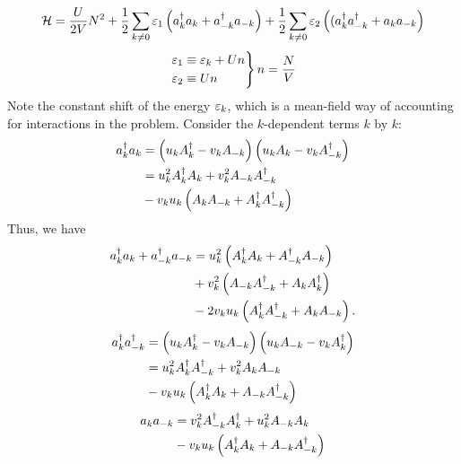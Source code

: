 \begin{equation}
	\label{eq:bose_hubbard_hamiltonian_mft}
	\mathcal{H} = \frac{U}{2V}N^2 + \frac{1}{2}\sum_{k\ne0}\varepsilon_1\left (a_{k}^{\dagger}a_{k} + a_{-k}^{\dagger}a_{-k}\right ) + \frac{1}{2}\sum_{k\ne0}\varepsilon_{2}\left ((a_{k}^{\dagger}a_{-k}^{\dagger} + a_{k}a_{-k}\right )
\end{equation}
\begin{equation}
	\begin{rcases}
		\varepsilon_1 \equiv \varepsilon_k + Un \\
		\varepsilon_2 \equiv Un
	\end{rcases}
	n = \frac{N}{V}
\end{equation}
Note the constant shift of the energy $\varepsilon_k$, which is a mean-field way of accounting for interactions in the problem. 
Consider the $k$-dependent terms $k$ by $k$:
\begin{equation}
	\begin{aligned}
		a_{k}^{\dagger}a_{k} &= \left (u_kA_k^{\dagger}-v_kA_{-k}\right )\left (u_kA_k-v_kA_{-k}^{\dagger}\right ) \\
		&= u_k^2A_{k}^{\dagger}A_{k} + v_{k}^2 A_{-k}A_{-k}^{\dagger} \\
		& - v_ku_k\left (A_{k}A_{-k} + A_{k}^{\dagger}A_{-k}^{\dagger}\right )
	\end{aligned}
\end{equation}
Thus, we have
\begin{equation}
	\begin{aligned}
		a_{k}^{\dagger}a_{k} + a_{-k}^{\dagger}a_{-k} &= u_k^2\left (A_{k}^{\dagger}A_{k} +A_{-k}^{\dagger}A_{-k}\right ) \\
		& + v_{k}^2\left (A_{-k}A_{-k}^{\dagger} + A_{k}A_{k}^{\dagger}\right ) \\
		&-2v_ku_k\left (A_{k}^{\dagger}A_{-k}^{\dagger}+A_{k}A_{-k}\right ).
	\end{aligned}
\end{equation}
\begin{equation}
	\begin{aligned}
		a_{k}^{\dagger}a_{-k}^{\dagger} &= \left (u_kA_k^{\dagger}-v_kA_{-k}\right )\left (u_kA_{-k}-v_kA_{k}^{\dagger}\right ) \\
		&= u_k^2A_{k}^{\dagger}A_{-k}^{\dagger} + v_{k}^2 A_{k}A_{-k} \\
		& - v_ku_k\left (A_{k}^{\dagger}A_{k} + A_{-k}A_{-k}^{\dagger}\right )
	\end{aligned}
\end{equation}
\begin{equation}
	\begin{aligned}
		a_{k}a_{-k} &= v_k^2A_{-k}^{\dagger}A_{k}^{\dagger} + u_{k}^2 A_{-k}A_{k} \\
		& - v_ku_k\left (A_{k}^{\dagger}A_{k} + A_{-k}A_{-k}^{\dagger}\right )
	\end{aligned}
\end{equation}
